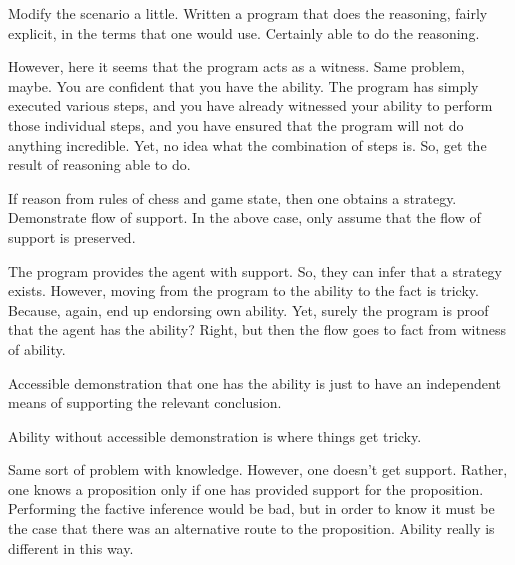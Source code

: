 \documentclass[10pt]{article}
\begin{document}
\begin{note}
  Modify the scenario a little.
  Written a program that does the reasoning, fairly explicit, in the terms that one would use.
  Certainly able to do the reasoning.

  However, here it seems that the program acts as a witness.
  Same problem, maybe.
  You are confident that you have the ability.
  The program has simply executed various steps, and you have already witnessed your ability to perform those individual steps, and you have ensured that the program will not do anything incredible.
  Yet, no idea what the combination of steps is.
  So, get the result of reasoning able to do.

  If reason from rules of chess and game state, then one obtains a strategy.
  Demonstrate flow of support.
  In the above case, only assume that the flow of support is preserved.

  The program provides the agent with support.
  So, they can infer that a strategy exists.
  However, moving from the program to the ability to the fact is tricky.
  Because, again, end up endorsing own ability.
  Yet, surely the program is proof that the agent has the ability?
  Right, but then the flow goes to fact from witness of ability.

  Accessible demonstration that one has the ability is just to have an independent means of supporting the relevant conclusion.

  Ability without accessible demonstration is where things get tricky.
\end{note}

\begin{note}
  Same sort of problem with knowledge.
  However, one doesn't get support.
  Rather, one knows a proposition only if one has provided support for the proposition.
  Performing the factive inference would be bad, but in order to know it must be the case that there was an alternative route to the proposition.
  Ability really is different in this way.
\end{note}
\end{document}
